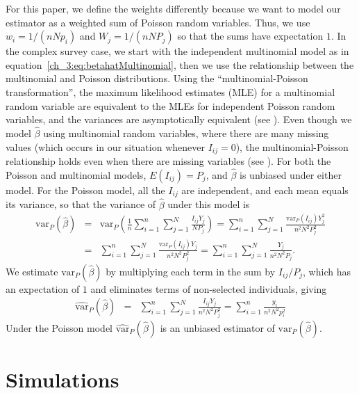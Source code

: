 For this paper, we define the weights differently because we want to model our estimator as a weighted sum of Poisson random variables.
Thus, we use $w_i = 1/(nNp_i)$ and $W_j= 1/(nNP_j)$ so that the sums have expectation $1$.
In the complex survey case,
we start with the independent multinomial model as in equation~\ref{ch_3:eq:betahatMultinomial}, then we use the relationship between the multinomial and Poisson distributions.
Using the ``multinomial-Poisson transformation'', the maximum
likelihood estimates (MLE) for a multinomial random variable are equivalent to the MLEs for independent Poisson random variables, and
the variances are asymptotically equivalent (see \citep{Baker:1994}).
Even though we model $\hat{\beta}$ using multinomial random variables, where there are many missing values (which occurs in our situation whenever $I_{ij}=0$),
the multinomial-Poisson relationship holds even when there are missing variables (see \citep[Section 3]{Baker:1994}).
For both the Poisson and multinomial models, $E(I_{ij}) = P_j$, and $\hat{\beta}$ is unbiased under either model.
For the Poisson model, all the $I_{ij}$ are independent, and each mean equals its variance, so that the variance of $\hat{\beta}$ under this model is
\begin{eqnarray*}
\textrm{var}_P \left(\hat{\beta} \right) & = & \textrm{var}_P \left( \frac{1}{n} \sum_{i=1}^{n} \sum_{j=1}^{N} \frac{ I_{ij} Y_j}{N P_j} \right)
 = \sum_{i=1}^{n} \sum_{j=1}^{N} \frac{ \textrm{var}_P( I_{ij}) Y_j^2}{n^2 N^2 P_j^2} \\
& = & \sum_{i=1}^{n} \sum_{j=1}^{N} \frac{ \textrm{var}_P( I_{ij}) Y_j}{n^2 N^2 P_j^2}
 =     \sum_{i=1}^{n} \sum_{j=1}^{N} \frac{ Y_j}{n^2 N^2 P_j}.
\end{eqnarray*}
We estimate $\textrm{var}_P \left(\hat{\beta} \right)$ by multiplying each term in the sum by $I_{ij}/P_j$, which has an expectation of $1$ and eliminates terms of non-selected individuals, giving
\begin{eqnarray}
\widehat{\textrm{var}}_P \left(\hat{\beta} \right)
& = & \sum_{i=1}^{n} \sum_{j=1}^{N} \frac{ I_{ij} Y_j}{n^2 N^2 P_j^2} = \sum_{i=1}^{n} \frac{ y_i}{n^2 N^2 p_i^2} \label{ch_3:eq:hatvarbetahat1}
\end{eqnarray}
Under the Poisson model $\widehat{\textrm{var}}_P \left(\hat{\beta} \right)$ is an unbiased estimator of $\textrm{var}_P \left(\hat{\beta} \right)$.



\section{Simulations}

